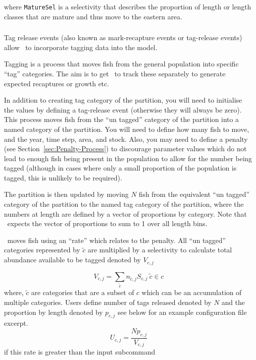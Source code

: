 where \texttt{MatureSel} is a selectivity that describes the proportion of length or length classes that are mature and thus move to the eastern area.


\subsubsection{}\label{sec:Process-Tagging} 
Tag release events (also known as mark-recapture events or tag-release events) allow \CNAME\ to incorporate tagging data into the model.

Tagging is a process that moves fish from the general population into specific \enquote{tag} categories. The aim is to get \CNAME\ to track these separately to generate expected recaptures or growth etc.

In addition to creating tag category of the partition, you will need to initialise the values by defining a tag-release event (otherwise they will always be zero). This process moves fish from the \enquote{un tagged} category of the partition into a named category of the partition. You will need to define how many fish to move, and the year, time step, area, and stock. Also, you may
need to define a penalty (see Section~\ref{sec:Penalty-Process}) to discourage parameter values which do not lead to enough fish being present in the population to allow for the number being tagged (although in cases where only a small proportion of the population is tagged, this is unlikely to be required).

The partition is then updated by moving \(N\) fish from the equivalent \enquote{un tagged} category of the partition to the named tag category of the partition, where the numbers at length are defined by a vector of proportions by category. Note that \CNAME\ expects the vector of proportions to sum to 1 over all length bins.

\CNAME\ moves fish using an \enquote{rate} which relates to the penalty. All \enquote{un tagged} categories represented by \(\tilde{c}\) are multiplied by a selectivity to calculate total abundance available to be tagged denoted by \(V_{c,j}\)

\begin{equation*}
	V_{c,j} = \sum\limits_{\tilde{c}} n_{\tilde{c}, j} S_{c,j} \ \tilde{c} \in c
\end{equation*}
%
where, \(\tilde{c}\) are categories that are a subset of \(c\) which can be an accumulation of multiple categories. Users define number of tags released denoted by \(N\) and the proportion by length denoted by \(p_{c,j}\) see below for an example configuration file excerpt.
\begin{equation*}
U_{c,j} = \frac{Np_{c,j}}{V_{c,j}}
\end{equation*}
%
if this rate is greater than the input subcommand 

